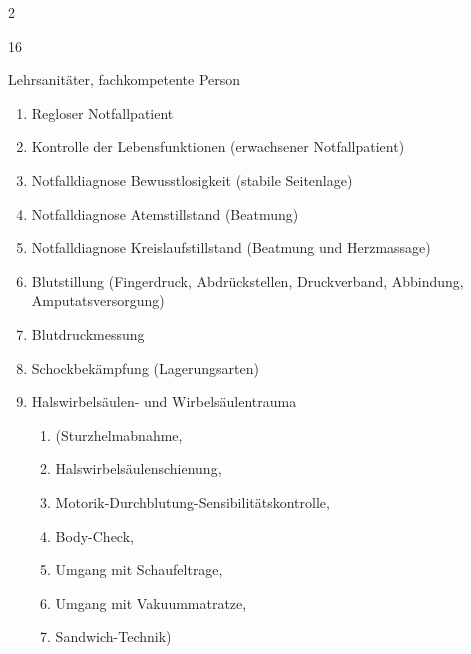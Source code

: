 \begin{WidePar}
\begin{multicols}{2}
  \begin{inparadesc}
    \item[Stundenanzahl:] 16
    \item[Lehrkraft:] Lehrsanitäter, fachkompetente Person
  \end{inparadesc}
  
  \begin{enumerate}
    \item Regloser Notfallpatient \dotfill {}
    \item    Kontrolle der  Lebensfunktionen  (erwachsener Notfallpatient)
    \dotfill
    \item    Notfalldiagnose Bewusstlosigkeit (stabile Seitenlage)
    \dotfill
    \item    Notfalldiagnose Atemstillstand (Beatmung)
    \dotfill
    \item    Notfalldiagnose Kreislaufstillstand (Beatmung und Herzmassage)
    \dotfill
    \item    Blutstillung (Fingerdruck, Abdrückstellen, Druckverband, Abbindung, Amputatsversorgung)
    \dotfill
    \item    Blutdruckmessung
    \dotfill
    \item    Schockbekämpfung (Lagerungsarten)
    \dotfill
    \item
    Halswirbelsäulen- und Wirbelsäulentrauma
    \dotfill
    \begin{enumerate}
      \item      (Sturzhelmabnahme,
      \dotfill
      \item      Halswirbelsäulenschienung,
      \dotfill
      \item      Motorik-Durchblutung-Sensibilitätskontrolle,
      \dotfill
      \item      Body-Check,
      \dotfill
      \item      Umgang mit Schaufeltrage,
      \dotfill
      \item      Umgang mit Vakuummatratze,
      \dotfill
      \item      Sandwich-Technik)

\end{enumerate}
\end{enumerate}
\end{multicols}
\end{WidePar}
